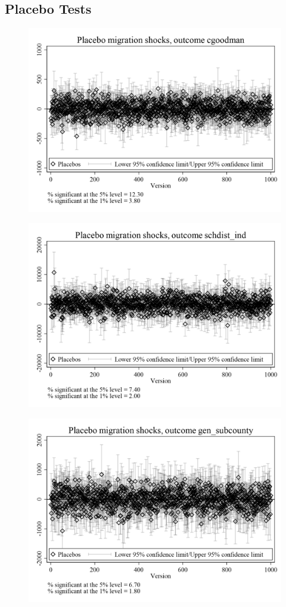 \documentclass{article}
\begin{document}


\clearpage

\subsection{Placebo Tests}
\clearpage
\begin{figure}
	\centering
	\includegraphics[width=.8\textwidth]{figures/exogeneity_tests/D17_placebo_cgoodman_urban.png}
\end{figure}
\clearpage
\begin{figure}
	\centering
	\includegraphics[width=.8\textwidth]{figures/exogeneity_tests/D17_placebo_schdist_ind_urban.png}
\end{figure}
\clearpage
\begin{figure}
	\centering
	\includegraphics[width=.8\textwidth]{figures/exogeneity_tests/D17_placebo_gen_subcounty_urban.png}
\end{figure}
\end{document}

